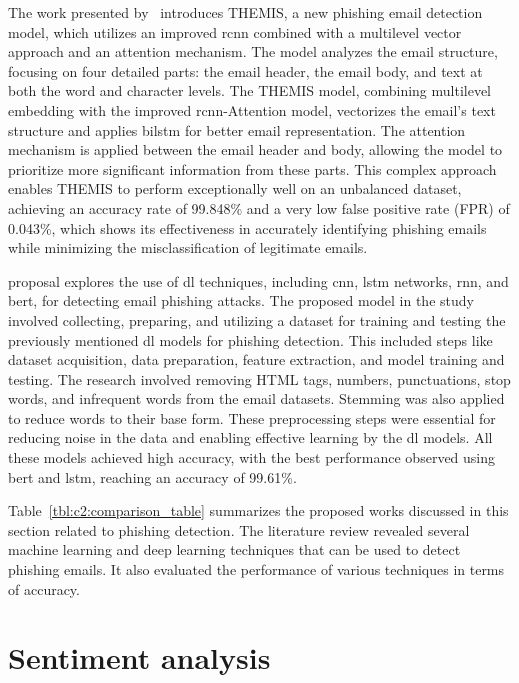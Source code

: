 The work presented by~\citet{8701426} introduces THEMIS, a new phishing email detection model, which utilizes an improved \ac{rcnn} combined with a multilevel vector approach and an attention mechanism. The model analyzes the email structure, focusing on four detailed parts: the email header, the email body, and text at both the word and character levels.
The THEMIS model, combining multilevel embedding with the improved \ac{rcnn}-Attention model, vectorizes the email's text structure and applies \ac{bilstm} for better email representation. The attention mechanism is applied between the email header and body, allowing the model to prioritize more significant information from these parts. This complex approach enables THEMIS to perform exceptionally well on an unbalanced dataset, achieving an accuracy rate of 99.848\% and a very low false positive rate (FPR) of 0.043\%, which shows its effectiveness in accurately identifying phishing emails while minimizing the misclassification of legitimate emails.

\citet{atawneh2023phishing} proposal explores the use of \ac{dl} techniques, including \ac{cnn}, \ac{lstm} networks, \ac{rnn}, and \ac{bert}, for detecting email phishing attacks. The proposed model in the study involved collecting, preparing, and utilizing a dataset for training and testing the previously mentioned \ac{dl} models for phishing detection. This included steps like dataset acquisition, data preparation, feature extraction, and model training and testing. The research involved removing HTML tags, numbers, punctuations, stop words, and infrequent words from the email datasets. Stemming was also applied to reduce words to their base form. These preprocessing steps were essential for reducing noise in the data and enabling effective learning by the \ac{dl} models. All these models achieved high accuracy, with the best performance observed using \ac{bert} and \ac{lstm}, reaching an accuracy of 99.61\%.

Table~\ref{tbl:c2:comparison_table} summarizes the proposed works discussed in this section related to phishing detection. The literature review revealed several machine learning and deep learning techniques that can be used to detect phishing emails. It also evaluated the performance of various techniques in terms of accuracy.



\section{Sentiment analysis}

